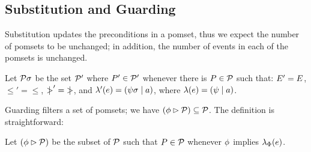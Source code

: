 

\subsection{Substitution and Guarding} 

Substitution updates the preconditions in a pomset, thus we expect the number
of pomsets to be unchanged; in addition, the number of events in each of the
pomsets is unchanged.
\begin{definition}
  Let $\mathcal{P}\sigma$ be the set $\mathcal{P}'$ where $P'\in\mathcal{P}'$ whenever
there is $P\in\mathcal{P}$ such that:
$E' = E$,
${\le'} = {\le}$, 
${\mathrel{\mkern4mu\mid\!\!\!>}'} = {\mathrel{\mkern4mu\mid\!\!\!>}}$,
and
$\lambda'(e) = (\psi\sigma \mid a)$, where $\lambda(e) = (\psi \mid a)$.
\end{definition}

Guarding filters a set of pomsets; we have
$(\phi\mathbin\rhd\mathcal{P})\subseteq\mathcal{P}$.
The definition is straightforward:
\begin{definition}
Let $(\phi \mathbin\rhd \mathcal{P})$ be the subset of $\mathcal{P}$ such that $P\in\mathcal{P}$ whenever
$\phi$ implies $\lambda_{\Phi}(e)$.
\end{definition}

